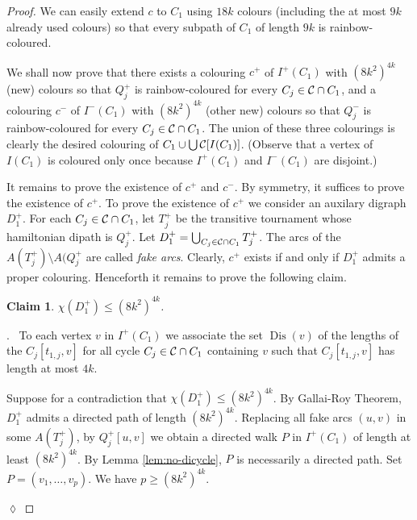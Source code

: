 \documentclass[utf8,11pt]{article}
\theoremstyle{plain}
\newtheorem{claim}{Claim}[theorem]
\theoremstyle{definition}
\theoremstyle{remark}
\newenvironment{subproof}{\par\noindent {\it Subproof}.\ }{\hfill$\lozenge$\par\vspace{11pt}}
\newcommand{\col}{(8k^2)^{4k}}
\DeclareMathOperator{\Dis}{Dis}
\begin{document}
\begin{proof}
We can easily extend $c$ to $C_1$ using $18k$ colours (including the at most $9k$ already used colours)
so that every subpath of $C_1$ of length $9k$ is rainbow-coloured.

We shall now prove that there exists a colouring $c^+$ of $I^+(C_1)$ with $\col$ (new) colours so that $Q^+_j$ is rainbow-coloured for every $C_j\in {\cal C}\cap C_1$, and a colouring $c^-$ of $I^-(C_1)$ with $\col$ (other new) colours so that $Q^-_j$ is rainbow-coloured for every $C_j\in {\cal C}\cap C_1$.
The union of these three colourings is clearly the desired colouring of $C_1\cup \bigcup{\cal C}[I(C_1)]$. (Observe that a vertex of $I(C_1)$ is coloured only once because  $I^+(C_1)$ and $I^-(C_1)$ are disjoint.)

It remains to prove the existence of $c^+$ and $c^-$. By symmetry, it suffices to prove the existence of $c^+$.
 To prove the existence of $c^+$ we consider an auxilary digraph $D^+_1$.
 For each $C_j\in {\cal C}\cap C_1$, let $T^+_j$ be the transitive tournament whose hamiltonian dipath is $Q^+_j$.
Let $D^+_1=\bigcup_{C_j\in  {\cal C}\cap C_1} T^+_j$. 
The arcs of the $A(T^+_j)\setminus A(Q^+_j$ are called {\it fake arcs}.
Clearly, $c^+$ exists if and only if $D^+_1$ admits a proper colouring. Henceforth it remains to prove the following claim.

\begin{claim}
$\chi(D^+_1) \leq  \col$.
\end{claim}

\begin{subproof}
To each vertex $v$ in $I^+(C_1)$ we associate the set $\Dis(v)$ of the lengths of the $C_j[t_{1,j},v]$ for all cycle $C_j\in {\cal C} \cap C_1$ containing $v$ such that $C_j[t_{1,j},v]$ has length at most $4k$.


Suppose for a contradiction that $\chi(D^+_1) \leq  \col$.
By Gallai-Roy Theorem, $D^+_1$ admits a directed path of length $\col$. Replacing all fake arcs  $(u,v)$ in some $A(T^+_j)$, by 
$Q^+_j[u,v]$ we obtain a directed walk $P$ in $I^+(C_1)$ of length at least $\col$. By Lemma \ref{lem:no-dicycle}, $P$ is necessarily a directed path. Set $P=(v_1,  \dots , v_{p})$. We have $p\geq \col$.


\end{subproof}
\end{proof}
\end{document}
